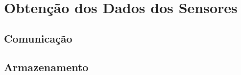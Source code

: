 \chapter{Obtenção dos Dados dos Sensores}
\label{c:obtencao_dos_dados_dos_sensores}

\section{Comunicação}

\lipsum[21-22]

\section{Armazenamento}

\lipsum[23]
